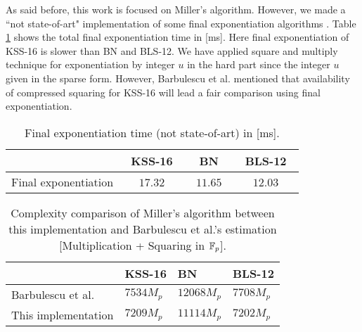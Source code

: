 As said before, this work is focused on Miller's algorithm. However, we made a ``not state-of-art" implementation of some  final exponentiation algorithms \cite{EPRINT:GhaFou16b,SAC:FueKnaRod11,EPRINT:GhaFou16a}. 
Table \ref{com_fe} shows the total final exponentiation time in [ms].
Here final exponentiation of KSS-16 is slower than BN and BLS-12.  
We have applied square and multiply technique for exponentiation by integer $u$ in the hard part since the integer $u$ given in the sparse form.
However, Barbulescu et al. \cite{EPRINT:BarDuq17} mentioned that availability of compressed squaring \cite{EC:AKLGL11} for KSS-16 will lead a fair comparison using final exponentiation.
\renewcommand{\baselinestretch}{1.5}
\begin{table}[ht]
	\centering
	\caption{Final exponentiation time (not state-of-art) in [ms].}
	\label{com_fe}
	\begin{tabular}{l|c|c|c|}
		\cline{2-4}
		& ~KSS-16~   & ~BN~       & ~BLS-12~   \\ \hline
		\multicolumn{1}{|l|}{Final exponentiation} & ~$17.32 $~ & ~$11.65 $~ & ~$12.03 $~ \\ \hline
	\end{tabular}
\end{table}
\renewcommand{\baselinestretch}{1.0}

\renewcommand{\baselinestretch}{1.5}
\begin{table}[ht]
	\centering
	\caption{Complexity comparison of Miller's algorithm between this implementation and Barbulescu et al.'s \cite{EPRINT:BarDuq17} estimation [Multiplication + Squaring in ${\mathbb{F}}_{p}$].}
	\label{com_com}
	\begin{tabular}{l|l|l|l|}
		\cline{2-4}
		& KSS-16     & BN          & BLS-12      \\ \hline
		\multicolumn{1}{|l|}{Barbulescu et al. \cite{EPRINT:BarDuq17}} & $ 7534 M_p$ & $12068 M_p$ & $7708 M_p$ \\ \hline
		\multicolumn{1}{|l|}{This implementation}         &     $7209 M_p$       &   $11114 M_p$          &        $7202 M_p$   \\ \hline
	\end{tabular}
\end{table}
\renewcommand{\baselinestretch}{1.0}


